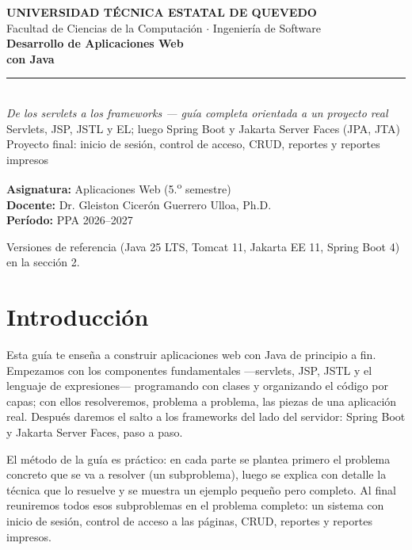 \documentclass[11pt]{article}
\begin{document}
\begin{titlepage}
\vspace*{1.1cm}
{\color{jwebazul}\bfseries\large UNIVERSIDAD T\'ECNICA ESTATAL DE QUEVEDO}\\[2pt]
{\color{gray} Facultad de Ciencias de la Computaci\'on $\cdot$ Ingenier\'ia de Software}\\[2cm]
{\color{tinta}\bfseries\fontsize{30}{34}\selectfont Desarrollo de Aplicaciones Web}\\[6pt]
{\color{jwebazul}\bfseries\fontsize{30}{34}\selectfont con Java}\\[10pt]
{\color{jweboro}\rule{\linewidth}{2.2pt}}\\[10pt]
{\itshape\large De los servlets a los frameworks --- gu\'ia completa orientada a un proyecto real}\\[4pt]
{\color{gray} Servlets, JSP, JSTL y EL; luego Spring Boot y Jakarta Server Faces (JPA, JTA)}\\[2.4cm]
{\color{jwebazulo} Proyecto final: inicio de sesi\'on, control de acceso, CRUD, reportes y reportes impresos}\\[2cm]
\begin{flushleft}
\textbf{Asignatura:} Aplicaciones Web (5.\textsuperscript{o} semestre)\\[3pt]
\textbf{Docente:} Dr. Gleiston Cicer\'on Guerrero Ulloa, Ph.D.\\[3pt]
\textbf{Per\'iodo:} PPA 2026--2027
\end{flushleft}
\vfill
{\color{gray}\small Versiones de referencia (Java 25 LTS, Tomcat 11, Jakarta EE 11, Spring Boot 4) en la secci\'on 2.}
\end{titlepage}
\tableofcontents
\clearpage
\section{Introducción}
Esta guía te enseña a construir aplicaciones web con Java de principio a fin. Empezamos con los componentes fundamentales —servlets, JSP, JSTL y el lenguaje de expresiones— programando con clases y organizando el código por capas; con ellos resolveremos, problema a problema, las piezas de una aplicación real. Después daremos el salto a los frameworks del lado del servidor: Spring Boot y Jakarta Server Faces, paso a paso.

El método de la guía es práctico: en cada parte se plantea primero el problema concreto que se va a resolver (un subproblema), luego se explica con detalle la técnica que lo resuelve y se muestra un ejemplo pequeño pero completo. Al final reuniremos todos esos subproblemas en el problema completo: un sistema con inicio de sesión, control de acceso a las páginas, CRUD, reportes y reportes impresos.
\end{document}
